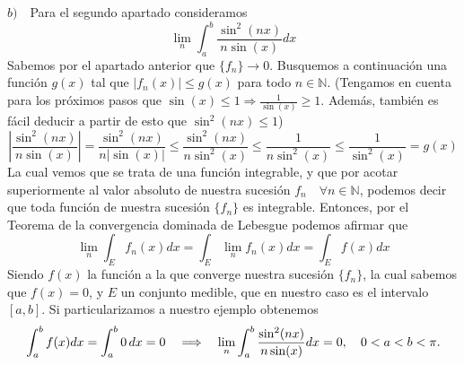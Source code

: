 \documentclass[fleqn]{article}
\def\N{\mathds{N}}
\begin{document}
$b) \quad$Para el segundo apartado consideramos
$$\lim_n \int _a^b \frac{\sin^2(nx)}{n \sin(x)}dx$$
Sabemos por el apartado anterior que $\{f_n\}\rightarrow 0$. Busquemos a continuación una función $g(x)$ tal que $|f_n(x)| \leq g(x)$
para todo $n \in \N$. (Tengamos en cuenta para los próximos pasos que $\sin(x) \leq 1 \Rightarrow \frac{1}{\sin(x)}\geq 1$. Además,
también es fácil deducir a partir de esto que $\sin^2(nx) \leq 1$)
$$\left|\frac{\sin^2(nx)}{n \sin(x)}\right| = \frac{\sin^2(nx)}{n |\sin(x)|} \leq \frac{\sin^2(nx)}{n \sin^2(x)} \leq \frac{1}{n \sin^2(x)} \leq \frac{1}{\sin^2(x)} = g(x)$$
La cual vemos que se trata de una función integrable, y que por acotar superiormente al valor absoluto de nuestra sucesión ${f_n} \quad \forall n \in \N$,
podemos decir que toda función de nuestra sucesión $\{f_n\}$ es integrable. Entonces, por el Teorema de la convergencia dominada de Lebesgue podemos afirmar que 
$$\lim_n \int_E f_n(x) dx = \int_E \lim_n f_n(x) dx = \int_E f(x)dx $$
Siendo $f(x)$ la función a la que converge nuestra sucesión $\{f_n\}$, la cual sabemos que $f(x)=0$, y $E$ un conjunto medible, que en nuestro caso es el intervalo $[a,b]$. 
Si particularizamos a nuestro ejemplo obtenemos
$$\int_a^b f(x)dx = \int_a^b0 \thinspace dx = 0 \quad \Longrightarrow \quad \lim_n \int _a^b \frac{\sin^2(nx)}{n \sin(x)}dx = 0, \quad 0 < a < b < \pi.$$
\end{document}
